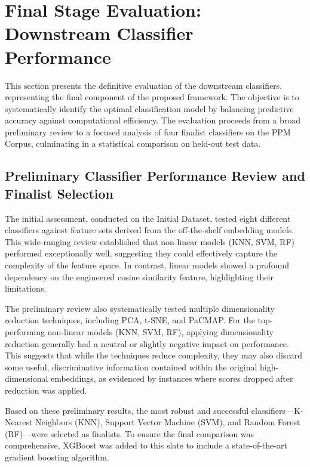 \section{Final Stage Evaluation: Downstream Classifier Performance}\label{ch:4.5}
This section presents the definitive evaluation of the downstream classifiers, representing the final component of the proposed framework. The objective is to systematically identify the optimal classification model by balancing predictive accuracy against computational efficiency. The evaluation proceeds from a broad preliminary review to a focused analysis of four finalist classifiers on the PPM Corpus, culminating in a statistical comparison on held-out test data.

\subsection{Preliminary Classifier Performance Review and Finalist Selection}\label{ch:4.5.1}
The initial assessment, conducted on the Initial Dataset, tested eight different classifiers against feature sets derived from the off-the-shelf embedding models. This wide-ranging review established that non-linear models (KNN, SVM, RF) performed exceptionally well, suggesting they could effectively capture the complexity of the feature space. In contrast, linear models showed a profound dependency on the engineered cosine similarity feature, highlighting their limitations.

The preliminary review also systematically tested multiple dimensionality reduction techniques, including PCA, t-SNE, and PaCMAP. For the top-performing non-linear models (KNN, SVM, RF), applying dimensionality reduction generally had a neutral or slightly negative impact on performance. This suggests that while the techniques reduce complexity, they may also discard some useful, discriminative information contained within the original high-dimensional embeddings, as evidenced by instances where scores dropped after reduction was applied.

Based on these preliminary results, the most robust and successful classifiers—K-Nearest Neighbors (KNN), Support Vector Machine (SVM), and Random Forest (RF)—were selected as finalists. To ensure the final comparison was comprehensive, XGBoost was added to this slate to include a state-of-the-art gradient boosting algorithm.

